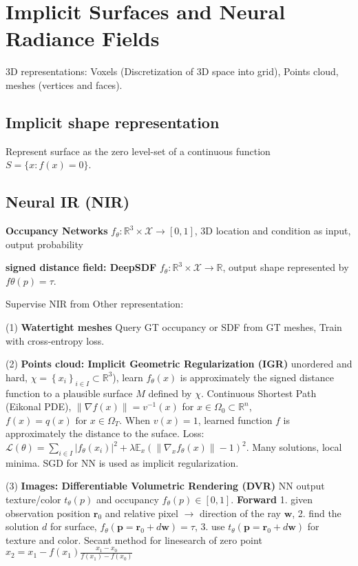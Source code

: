 \section{Implicit Surfaces and Neural Radiance Fields}
3D representations: Voxels (Discretization of 3D space into grid), Points cloud, meshes (vertices and faces).

\subsection*{Implicit shape representation}
Represent surface as the zero level-set of a continuous function \(S = \{x: f(x) = 0\}\).

\subsection*{Neural IR (NIR)}

\textbf{Occupancy Networks} \(f_{\theta}: \mathbb{R}^{3} \times \mathcal{X} \rightarrow[0,1]\), 3D location and  condition as input, output probability

\textbf{signed distance field: DeepSDF} \(f_{\theta}: \mathbb{R}^{3} \times \mathcal{X} \rightarrow \mathbb{R}\), output shape represented by \(f\theta(p) = \tau\).

\textsf{Supervise NIR from Other representation}:

(1) \textbf{Watertight meshes} Query GT occupancy or SDF from GT meshes, Train with cross-entropy loss.

(2) \textbf{Points cloud: Implicit Geometric Regularization (IGR)} unordered and hard, \(\chi=\left\{x_{i}\right\}_{i \in I} \subset \mathbb{R}^{3}\)), learn \(f_{\theta}(x)\) is approximately the signed distance function to a plausible surface \(M\) defined by \(\chi\).
% 
Continuous Shortest Path (Eikonal PDE), \(\|\nabla f(x)\|= v^{-1}(x)\) for \(x \in \Omega_{0} \subset \mathbb{R}^{n}\), \(f(x)=q(x) \text { for } x \in \Omega_{T}\). When \(v(x) = 1\), learned function \(f\) is approximately the distance to the suface.
% 
Loss: \(\mathcal{L}(\theta)=\sum_{i \in I}\left|f_{\theta}\left(x_{i}\right)\right|^{2}+\lambda \mathbb{E}_{x}\left(\left\|\nabla_{x} f_{\theta}(x)\right\|-1\right)^{2}\).
% 
Many solutions, local minima. SGD for NN is used as implicit regularization.

(3) \textbf{Images: Differentiable Volumetric Rendering (DVR)}
% 
NN output texture/color \(t_\theta(p)\) and occupancy \(f_\theta(p) \in [0, 1]\).
% 
\textbf{Forward}
1. given observation position \(\mathbf{r}_0\) and relative pixel \(\to\) direction of the ray \(\mathbf{w}\),
2. find the solution \(d\) for surface, \(f_\theta (\mathbf{p} = \mathbf{r}_0 + d \mathbf{w}) = \tau\),
3. use \(t_\theta(\mathbf{p} = \mathbf{r}_0 + d \mathbf{w})\) for texture and color. Secant method for linesearch of zero point \(x_{2}=x_{1}-f\left(x_{1}\right) \frac{x_{1}-x_{0}}{f\left(x_{1}\right)-f\left(x_{0}\right)}\)

